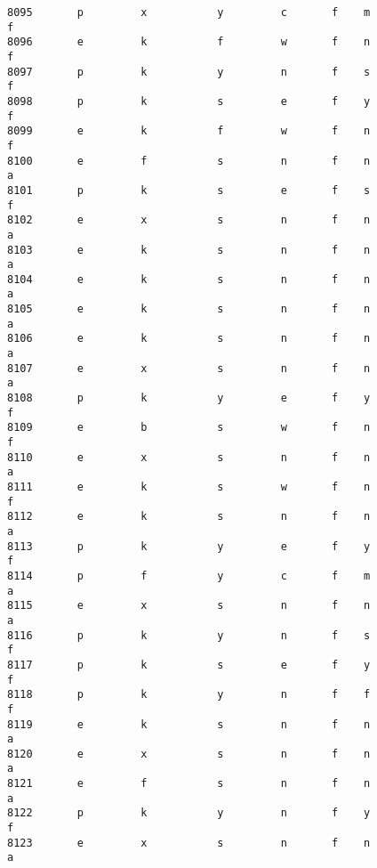 \documentclass[11pt]{article}
\begin{document}
\begin{verbatim}
8095       p         x           y         c       f    m               f   
8096       e         k           f         w       f    n               f   
8097       p         k           y         n       f    s               f   
8098       p         k           s         e       f    y               f   
8099       e         k           f         w       f    n               f   
8100       e         f           s         n       f    n               a   
8101       p         k           s         e       f    s               f   
8102       e         x           s         n       f    n               a   
8103       e         k           s         n       f    n               a   
8104       e         k           s         n       f    n               a   
8105       e         k           s         n       f    n               a   
8106       e         k           s         n       f    n               a   
8107       e         x           s         n       f    n               a   
8108       p         k           y         e       f    y               f   
8109       e         b           s         w       f    n               f   
8110       e         x           s         n       f    n               a   
8111       e         k           s         w       f    n               f   
8112       e         k           s         n       f    n               a   
8113       p         k           y         e       f    y               f   
8114       p         f           y         c       f    m               a   
8115       e         x           s         n       f    n               a   
8116       p         k           y         n       f    s               f   
8117       p         k           s         e       f    y               f   
8118       p         k           y         n       f    f               f   
8119       e         k           s         n       f    n               a   
8120       e         x           s         n       f    n               a   
8121       e         f           s         n       f    n               a   
8122       p         k           y         n       f    y               f   
8123       e         x           s         n       f    n               a   


\end{verbatim}
\end{document}
